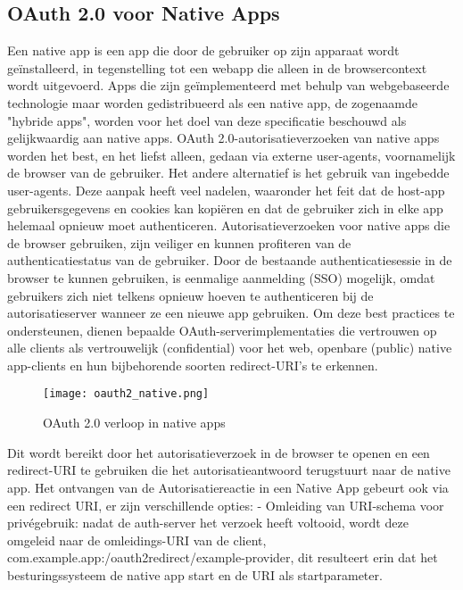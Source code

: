 \subsection{OAuth 2.0 voor Native Apps}%
\label{subsec:oauth-2.0-voor-native-apps}
\autocite{Denniss2017}
Een native app is een app die door de gebruiker op zijn apparaat wordt geïnstalleerd, in tegenstelling tot een webapp die alleen in de browsercontext wordt uitgevoerd. Apps die zijn geïmplementeerd met behulp van webgebaseerde technologie maar worden gedistribueerd als een native app, de zogenaamde "hybride apps", worden voor het doel van deze specificatie beschouwd als gelijkwaardig aan native apps.
OAuth 2.0-autorisatieverzoeken van native apps worden het best, en het liefst alleen, gedaan via externe user-agents, voornamelijk de browser van de gebruiker. Het andere alternatief is het gebruik van ingebedde user-agents. Deze aanpak heeft veel nadelen, waaronder het feit dat de host-app gebruikersgegevens en cookies kan kopiëren en dat de gebruiker zich in elke app helemaal opnieuw moet authenticeren. Autorisatieverzoeken voor native apps die de browser gebruiken, zijn veiliger en kunnen profiteren van de authenticatiestatus van de gebruiker. Door de bestaande authenticatiesessie in de browser te kunnen gebruiken, is eenmalige aanmelding (SSO) mogelijk, omdat gebruikers zich niet telkens opnieuw hoeven te authenticeren bij de autorisatieserver wanneer ze een nieuwe app gebruiken.
Om deze best practices te ondersteunen, dienen bepaalde OAuth-serverimplementaties die vertrouwen op alle clients als vertrouwelijk (confidential) voor het web, openbare (public) native app-clients en hun bijbehorende soorten redirect-URI's te erkennen.
\begin{figure}[h]
  \centering
  \texttt{[image: oauth2\_native.png]}
  \caption{OAuth 2.0 verloop in native apps}
  \label{fig:example2}
\end{figure}
\newline
Dit wordt bereikt door het autorisatieverzoek in de browser te openen en een redirect-URI te gebruiken die het autorisatieantwoord terugstuurt naar de native app.
\newline
\newline
Het ontvangen van de Autorisatiereactie in een Native App gebeurt ook via een redirect URI, er zijn verschillende opties:
\newline
- Omleiding van URI-schema voor privégebruik: nadat de auth-server het verzoek heeft voltooid, wordt deze omgeleid naar de omleidings-URI van de client, com.example.app:/oauth2redirect/example-provider, dit resulteert erin dat het besturingssysteem de native app start en de URI als startparameter.
